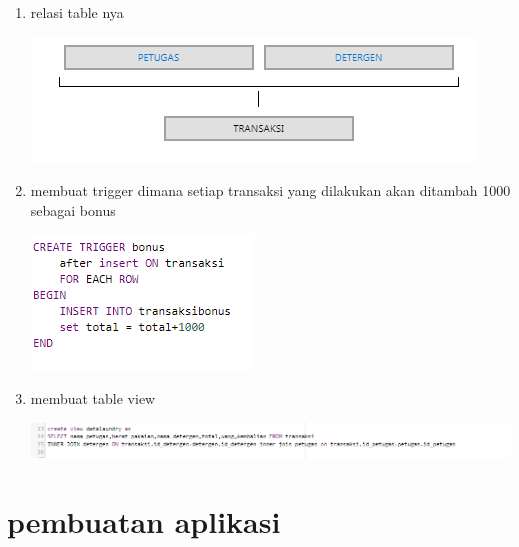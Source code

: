 \documentclass{article}
\begin{document}
\begin{enumerate}
\item relasi table nya
    \begin{center}
         \centering
            \includegraphics[scale=0.27]{gambar/Capture5.PNG}
        \caption{}
        \label{excel}
    \end{center}
    
\item membuat trigger dimana setiap transaksi yang dilakukan akan ditambah 1000 sebagai bonus
    \begin{center}
         \centering
            \includegraphics[scale=0.27]{gambar/Capture8.PNG}
        \caption{}
        \label{excel}
    \end{center}
    
\item membuat table view
    \begin{center}
         \centering
            \includegraphics[scale=0.27]{gambar/Capture6.PNG}
        \caption{}
        \label{excel}
    \end{center}

    
\end{enumerate}


\section{pembuatan aplikasi}
\end{document}

